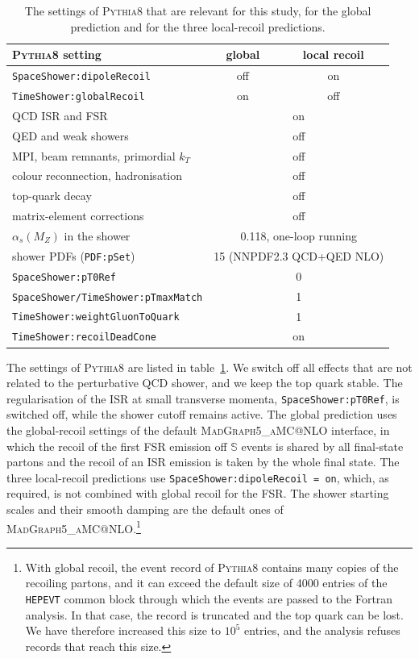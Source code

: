 \documentclass[a4paper,11pt]{article}
\makeatletter
\newcommand{\as}{\alpha_s}
\newcommand{\mgamc}{\textsc{MadGraph5\_aMC@NLO}\xspace}
\newcommand{\pythia}{\textsc{Pythia8}\xspace}
\newcommand{\code}[1]{\texttt{#1}}
\newcommand{\clS}{\mathbb{S}}
\newcommand{\glob}{global\xspace}
\makeatother
\begin{document}
\begin{table}[t]
  \centering
  \begin{tabular}{@{}lcc@{}}
    \toprule
    \pythia setting & \glob & local recoil\\
    \midrule
    \code{SpaceShower:dipoleRecoil} & off & on\\
    \code{TimeShower:globalRecoil} & on & off\\
    \midrule
    QCD ISR and FSR & \multicolumn{2}{c}{on}\\
    QED and weak showers & \multicolumn{2}{c}{off}\\
    MPI, beam remnants, primordial $k_T$ & \multicolumn{2}{c}{off}\\
    colour reconnection, hadronisation & \multicolumn{2}{c}{off}\\
    top-quark decay & \multicolumn{2}{c}{off}\\
    matrix-element corrections & \multicolumn{2}{c}{off}\\
    $\as(M_Z)$ in the shower & \multicolumn{2}{c}{0.118, one-loop running}\\
    shower PDFs (\code{PDF:pSet}) & \multicolumn{2}{c}{15 (NNPDF2.3 QCD+QED NLO)}\\
    \code{SpaceShower:pT0Ref} & \multicolumn{2}{c}{0}\\
    \code{SpaceShower/TimeShower:pTmaxMatch} & \multicolumn{2}{c}{1}\\
    \code{TimeShower:weightGluonToQuark} & \multicolumn{2}{c}{1}\\
    \code{TimeShower:recoilDeadCone} & \multicolumn{2}{c}{on}\\
    \bottomrule
  \end{tabular}
  \caption{The settings of \pythia that are relevant for this study,
    for the \glob prediction and for the three local-recoil
    predictions.}
  \label{tab:settings}
\end{table}

The settings of \pythia are listed in table~\ref{tab:settings}. We
switch off all effects that are not related to the perturbative QCD
shower, and we keep the top quark stable. The regularisation of the
ISR at small transverse momenta, \code{SpaceShower:pT0Ref}, is
switched off, while the shower cutoff remains active. The \glob
prediction uses the global-recoil settings of the default \mgamc
interface, in which the recoil of the first FSR emission off $\clS$
events is shared by all final-state partons and the recoil of an ISR
emission is taken by the whole final state. The three local-recoil
predictions use \code{SpaceShower:dipoleRecoil = on}, which, as
required, is not combined with global recoil for the FSR. The shower
starting scales and their smooth damping are the default ones of
\mgamc.\footnote{With global recoil, the event record of \pythia
  contains many copies of the recoiling partons, and it can exceed
  the default size of 4000 entries of the \code{HEPEVT} common block
  through which the events are passed to the Fortran analysis. In
  that case, the record is truncated and the top quark can be lost.
  We have therefore increased this size to $10^5$ entries, and the
  analysis refuses records that reach this size.}
\end{document}
